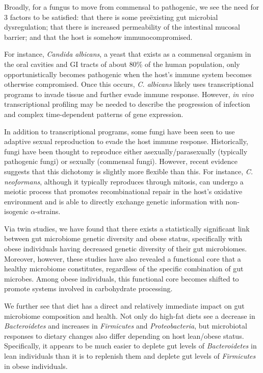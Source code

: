 \documentclass[11pt,letterpaper,final] {article}
\begin{document}
Broadly, for a fungus to move from commensal to pathogenic, we see the need for 3 factors to be satisfied: that there is some pre{\"e}xisting gut microbial dysregulation; that there is increased permeability of the intestinal mucosal barrier; and that the host is somehow immunocompromised.

For instance, {\itshape Candida albicans}, a yeast that exists as a commensal organism in the oral cavities and GI tracts of about $80$\% of the human population, only opportunistically becomes pathogenic when the host's immune system becomes otherwise compromised. Once this occurs, {\itshape C. albicans} likely uses transcriptional programs to invade tissue and further evade immune response. However, {\itshape in vivo} transcriptional profiling may be needed to describe the progression of infection and
complex time-dependent patterns of gene expression.

In addition to transcriptional programs, some fungi have been seen to use adaptive sexual reproduction to evade the host immune response. Historically, fungi have been thought to reproduce either asexually/parasexually (typically pathogenic fungi) or sexually (commensal fungi). However, recent evidence suggests that this dichotomy is slightly more flexible than this. For instance, {\itshape C. neoformans}, although it typically reproduces through mitosis, can undergo a meiotic process that promotes recombinational repair in the host’s oxidative environment and is able to directly exchange genetic information with non-isogenic $\alpha$-strains.

\clearpage
{}

Via twin studies, we have found that there exists a statistically significant link between gut microbiome genetic diversity and obese status, specifically with obese individuals having decreased genetic diversity of their gut microbiomes. Moreover, however, these studies have also revealed a functional core that a healthy microbiome constitutes, regardless of the specific combination of gut microbes. Among obese individuals, this functional core becomes shifted to promote systems involved in carbohydrate processing.

We further see that diet has a direct and relatively immediate impact on gut microbiome composition and health. Not only do high-fat diets see a decrease in {\itshape Bacteroidetes} and increases in {\itshape Firmicutes} and {\itshape Proteobacteria}, but microbiotal responses to dietary changes also differ depending on host lean/obese status. Specifically, it appears to be much easier to deplete gut levels of {\itshape Bacteroidetes} in lean individuals than it is to replenish them and deplete gut levels of {\itshape Firmicutes} in obese individuals.
\end{document}
